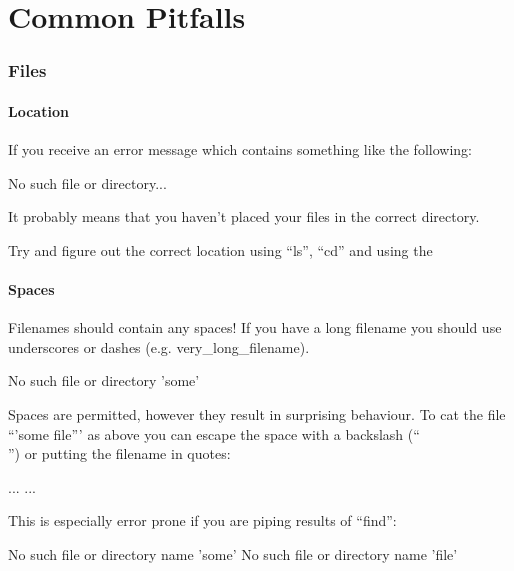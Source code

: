\chapter{Common Pitfalls}

\subsection{Files}

\subsubsection{Location}
If you receive an error message which contains something like the following:

\begin{prompt}
No such file or directory...
\end{prompt}

It probably means that you haven't placed your files in the correct directory.

Try and figure out the correct location using ``ls'', ``cd'' and using the

\subsubsection{Spaces}

Filenames should  contain any spaces! If you have a long filename
you should use underscores or dashes (e.g. very\_long\_filename).

\begin{prompt}
No such file or directory 'some'
\end{prompt}

Spaces are permitted, however they result in surprising behaviour. To cat the
file ``'some file''' as above you can escape the space with a backslash (``\\ '')
or putting the filename in quotes:

\begin{prompt}
...
...
\end{prompt}

This is especially error prone if you are piping results of ``find'':

\begin{prompt}
No such file or directory name 'some'
No such file or directory name 'file'
\end{prompt}

